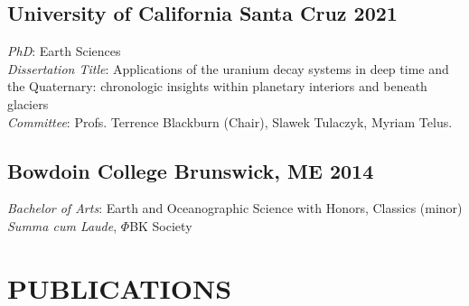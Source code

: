 \documentclass[10pt]{article}
\begin{document}
\subsection*{\textbf{University of California Santa Cruz} \hfill 2021}
\textit{PhD}: Earth Sciences\\
\textit{Dissertation Title}: Applications of the uranium decay systems in deep time and the Quaternary: chronologic insights within planetary interiors and beneath glaciers\\
\textit{Committee}: Profs. Terrence Blackburn (Chair), Slawek Tulaczyk, Myriam Telus.

\subsection*{\textbf{Bowdoin College} \hspace{15pt} Brunswick, ME \hfill 2014}
\textit{Bachelor of Arts}: Earth and Oceanographic Science with Honors, Classics (minor) \\
\textit{Summa cum Laude}, $\Phi$BK Society


\section*{PUBLICATIONS}
\end{document}
